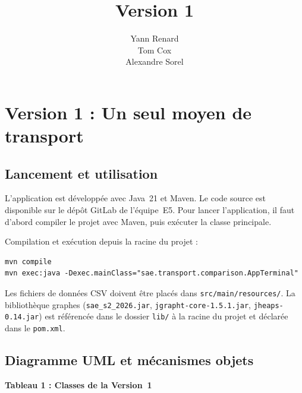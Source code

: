 \documentclass[fontsize=10pt,oneside,parskip=half]{scrreprt}
\title{Version 1}
\author{Yann Renard \\ Tom Cox \\ Alexandre Sorel}
\newcommand{\ic}[1]{{\setlength{\fboxsep}{2pt}\colorbox{BeigeSerein}{\texttt{#1}}}}
\begin{document}

\maketitle
\pagecolor{Blanc}
{%
  \setlength{\parskip}{0pt}%
  \tableofcontents%
}

\chapter{Version 1 : Un seul moyen de transport}

\section{Lancement et utilisation}

L'application est développée avec Java~21 et Maven. Le code source est disponible
sur le dépôt GitLab de l'équipe~E5. Pour lancer l'application, il faut d'abord
compiler le projet avec Maven, puis exécuter la classe principale.

Compilation et exécution depuis la racine du projet :

\begin{lstlisting}[style=bash]
mvn compile
mvn exec:java -Dexec.mainClass="sae.transport.comparison.AppTerminal"
\end{lstlisting}

Les fichiers de données CSV doivent être placés dans \ic{src/main/resources/}.
La bibliothèque graphes (\ic{sae\_s2\_2026.jar}, \ic{jgrapht-core-1.5.1.jar},
\ic{jheaps-0.14.jar}) est référencée dans le dossier \ic{lib/} à la racine du
projet et déclarée dans le \ic{pom.xml}.

\section{Diagramme UML et mécanismes objets}

\noindent\textbf{Tableau 1 : Classes de la Version~1}
\end{document}
